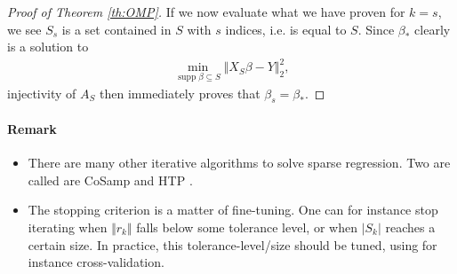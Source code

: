 \documentclass{article}
\DeclareMathOperator{\supp}{\mathrm{supp}}
\newcommand{\sse}{\subseteq}
\newcommand{\abs}[1]{\vert #1 \vert}
\newcommand{\norm}[1]{\Vert #1 \Vert}
\begin{document}
\begin{proof}[Proof of Theorem \ref{th:OMP}]
If we now evaluate what we have proven for $k=s$, we see $S_s$ is a set contained in $S$ with $s$ indices, i.e. is equal to $S$. Since $\beta_*$ clearly is a solution to 
\begin{align*}
    \min_{\supp \beta \sse S} \norm{X_{S}\beta - Y}_2^2,
\end{align*}
injectivity of $A_S$ then immediately proves that $\beta_s=\beta_*$.
\end{proof}

\paragraph{Remark}
\begin{itemize}
     \item There are many other iterative algorithms to solve sparse regression. Two are called are CoSamp \cite{needell2010cosamp} and HTP \cite{foucart2011hard}.
    \item The stopping criterion is a matter of fine-tuning. One can for instance stop iterating when $\norm{r_k}$ falls below some tolerance level, or when $\abs{S_k}$ reaches a certain size. In practice, this tolerance-level/size should be tuned, using for instance cross-validation.
\end{itemize}
\end{document}
